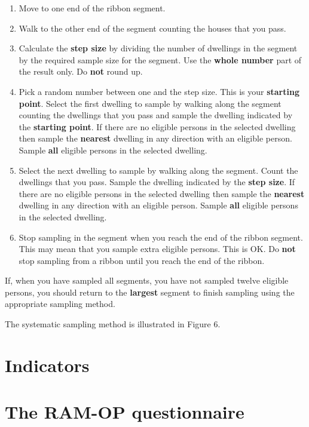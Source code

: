 \documentclass[12pt,]{book}
\theoremstyle{definition}
\theoremstyle{definition}
\theoremstyle{definition}
\theoremstyle{remark}
\begin{document}
\begin{enumerate}
\def\labelenumi{\arabic{enumi}.}
\item
  Move to one end of the ribbon segment.
\item
  Walk to the other end of the segment counting the houses that you
  pass.
\item
  Calculate the \textbf{step size} by dividing the number of dwellings
  in the segment by the required sample size for the segment. Use the
  \textbf{whole number} part of the result only. Do \textbf{not} round
  up.
\item
  Pick a random number between one and the step size. This is your
  \textbf{starting point}. Select the first dwelling to sample by
  walking along the segment counting the dwellings that you pass and
  sample the dwelling indicated by the \textbf{starting point}. If there
  are no eligible persons in the selected dwelling then sample the
  \textbf{nearest} dwelling in any direction with an eligible person.
  Sample \textbf{all} eligible persons in the selected dwelling.
\item
  Select the next dwelling to sample by walking along the segment. Count
  the dwellings that you pass. Sample the dwelling indicated by the
  \textbf{step size}. If there are no eligible persons in the selected
  dwelling then sample the \textbf{nearest} dwelling in any direction
  with an eligible person. Sample \textbf{all} eligible persons in the
  selected dwelling.
\item
  Stop sampling in the segment when you reach the end of the ribbon
  segment. This may mean that you sample extra eligible persons. This is
  OK. Do \textbf{not} stop sampling from a ribbon until you reach the
  end of the ribbon.
\end{enumerate}

If, when you have sampled all segments, you have not sampled twelve
eligible persons, you should return to the \textbf{largest} segment to
finish sampling using the appropriate sampling method.

The systematic sampling method is illustrated in Figure 6.

\hypertarget{indicators}{%
\chapter{Indicators}\label{indicators}}

\hypertarget{the-ram-op-questionnaire}{%
\chapter{The RAM-OP questionnaire}\label{the-ram-op-questionnaire}}
\end{document}
